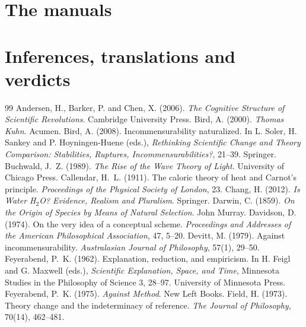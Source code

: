 \documentclass{situationist-preprint}
\begin{document}
\section{The manuals}\label{s:manuals}



\section{Inferences, translations and verdicts}\label{s:inferences}



\begin{thebibliography}{99}\small
{} Andersen, H., Barker, P. and Chen, X. (2006). \emph{The Cognitive Structure of Scientific Revolutions}. Cambridge University Press.
 Bird, A. (2000). \emph{Thomas Kuhn}. Acumen.
 Bird, A. (2008). Incommensurability naturalized. In L. Soler, H. Sankey and P. Hoyningen-Huene (eds.), \emph{Rethinking Scientific Change and Theory Comparison: Stabilities, Ruptures, Incommensurabilities?}, 21--39. Springer.
 Buchwald, J.~Z. (1989). \emph{The Rise of the Wave Theory of Light}. University of Chicago Press.
 Callendar, H.~L. (1911). The caloric theory of heat and Carnot's principle. \emph{Proceedings of the Physical Society of London}, 23.
 Chang, H. (2012). \emph{Is Water H$_2$O? Evidence, Realism and Pluralism}. Springer.
 Darwin, C. (1859). \emph{On the Origin of Species by Means of Natural Selection}. John Murray.
 Davidson, D. (1974). On the very idea of a conceptual scheme. \emph{Proceedings and Addresses of the American Philosophical Association}, 47, 5--20.
 Devitt, M. (1979). Against incommensurability. \emph{Australasian Journal of Philosophy}, 57(1), 29--50.
 Feyerabend, P.~K. (1962). Explanation, reduction, and empiricism. In H. Feigl and G. Maxwell (eds.), \emph{Scientific Explanation, Space, and Time}, Minnesota Studies in the Philosophy of Science 3, 28--97. University of Minnesota Press.
 Feyerabend, P.~K. (1975). \emph{Against Method}. New Left Books.
 Field, H. (1973). Theory change and the indeterminacy of reference. \emph{The Journal of Philosophy}, 70(14), 462--481.

\end{thebibliography}
\end{document}
